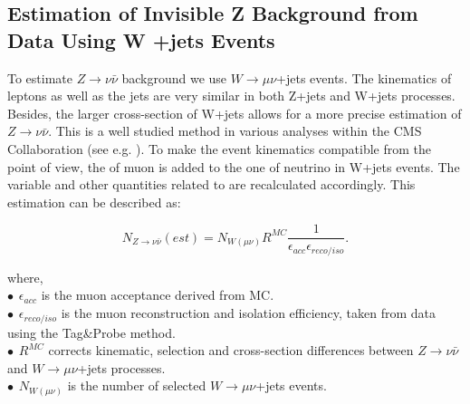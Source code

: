 \subsection{Estimation of Invisible Z Background from Data Using W +jets Events}
\label{sect:znunu}
To estimate $Z\rightarrow\nu\bar{\nu}$ background we use $W\rightarrow\mu\nu$+jets events. The kinematics of leptons as well as the jets are very similar in both Z+jets and W+jets processes. Besides, the larger cross-section of W+jets allows for a more precise estimation of
$Z\rightarrow\nu\bar{\nu}$.  This is a well studied method in various analyses within the CMS Collaboration (see e.g. \cite{CMS-PAS-SUS-08-002,CMS-PAS-SUS-10-001,CMS-PAS-SUS-11-005}).
To make the event kinematics compatible from the \met point of view, the \pT of muon is added to the one of neutrino in W+jets events. The \mttwo variable and other quantities related to \met are recalculated accordingly.
This estimation can be described as:

\begin{linenomath}
\begin{equation}
\label{eq:ZinvEst}
N_{Z\rightarrow\nu\bar{\nu}}(est) = N_{W (\mu\nu)} R^{MC} \frac{1}{\epsilon_{acc}\epsilon_{reco/iso}}.
\end{equation}
\end{linenomath}
where,\\
$\bullet \hspace{5pt} \epsilon_{acc}$ is the muon acceptance derived from MC.\\
$\bullet \hspace{5pt} \epsilon_{reco/iso}$ is the muon reconstruction and isolation efficiency, taken from data using the Tag\&Probe method.\\
$\bullet \hspace{5pt} R^{MC}$ corrects kinematic, selection and cross-section differences between $Z\rightarrow\nu\bar{\nu}$ and $W\rightarrow\mu\nu$+jets processes.\\
$\bullet \hspace{5pt} N_{W (\mu\nu)}$ is the number of selected $W\rightarrow\mu\nu$+jets events.\\

